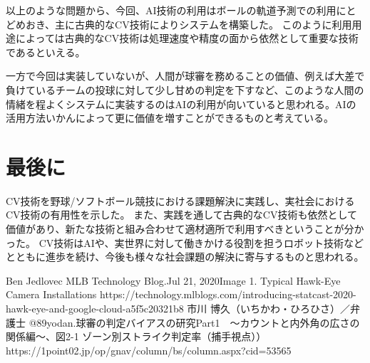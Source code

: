 \documentclass[submit]{ipsj}
\begin{document}
以上のような問題から、今回、AI技術の利用はボールの軌道予測での利用にとどめおき、主に古典的なCV技術によりシステムを構築した。
このように利用用途によっては古典的なCV技術は処理速度や精度の面から依然として重要な技術であるといえる。

一方で今回は実装していないが、人間が球審を務めることの価値、例えば大差で負けているチームの投球に対して少し甘めの判定を下すなど、このような人間の情緒を程よくシステムに実装するのはAIの利用が向いていると思われる。AIの活用方法いかんによって更に価値を増すことができるものと考えている。


\section{最後に}
CV技術を野球/ソフトボール競技における課題解決に実践し、実社会におけるCV技術の有用性を示した。
また、実践を通して古典的なCV技術も依然として価値があり、新たな技術と組み合わせて適材適所で利用すべきということが分かった。
CV技術はAIや、実世界に対して働きかける役割を担うロボット技術などとともに進歩を続け、今後も様々な社会課題の解決に寄与するものと思われる。

\begin{thebibliography}{99}
Ben Jedlovec MLB Technology Blog.Jul 21, 2020Image 1. Typical Hawk-Eye Camera Installations
https://technology.mlblogs.com/introducing-statcast-2020-hawk-eye-and-google-cloud-a5f5c20321b8
市川 博久（いちかわ・ひろひさ）／弁護士 @89yodan.球審の判定バイアスの研究Part1　～カウントと内外角の広さの関係編～、図2-1 ゾーン別ストライク判定率（捕手視点））
https://1point02.jp/op/gnav/column/bs/column.aspx?cid=53565
\end{thebibliography}
\end{document}
